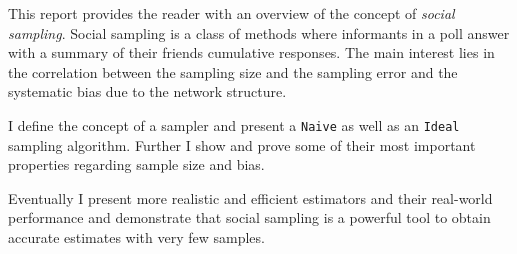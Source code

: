 This report provides the reader with an overview of the concept of \textit{social sampling}.
Social sampling is a class of methods where informants in a poll answer with a summary of their friends cumulative responses. The main interest lies in the correlation between the sampling size and the sampling error and the systematic bias due to the network structure.

I define the concept of a sampler and present a \texttt{Naive} as well as an \texttt{Ideal} sampling algorithm. Further I show and prove some of their most important properties regarding sample size and bias.

Eventually I present more realistic and efficient estimators and their real-world performance and demonstrate that social sampling is a powerful tool to obtain accurate estimates with very few samples.
